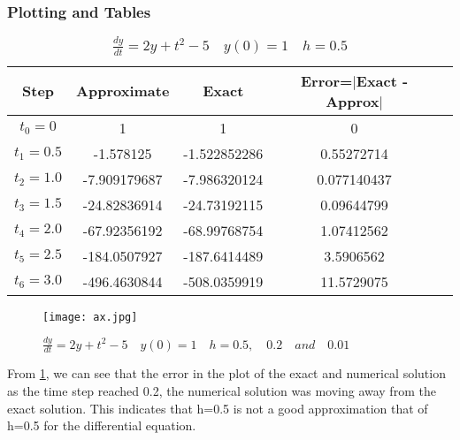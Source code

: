 \documentclass[12pt,a4paper]{article}
\begin{document}
\subsubsection{Plotting and Tables}
\begin{table}[ht]\caption{$\frac{dy}{dt} = 2y + t^2 - 5  \quad y(0)=1 \quad h=0.5$}
\begin{center}
\begin{tabular}{|c|c|c|c|c|}
\hline
Step  &  Approximate  & Exact & Error=$|$Exact - Approx$|$ \\
\hline
$t_0 = 0 $ & 1 & 1 & 0 \\
\hline
$t_1 = 0.5 $ & -1.578125 & -1.522852286 & 0.55272714 \\
\hline
$t_2 = 1.0 $ & -7.909179687 & -7.986320124 & 0.077140437 \\
\hline
$t_3 = 1.5 $ & -24.82836914 & -24.73192115 & 0.09644799 \\
\hline
$t_4 = 2.0 $ & -67.92356192 & -68.99768754 & 1.07412562 \\
\hline
$t_5 = 2.5 $ & -184.0507927 & -187.6414489 & 3.5906562 \\
\hline
$t_6 = 3.0 $ & -496.4630844 & -508.0359919 & 11.5729075 \\
\hline
\end{tabular}
\end{center}
\end{table}

\begin{figure}[h]
  \begin{center}
  \texttt{[image: ax.jpg]}
  \end{center}
  \caption{$\frac{dy}{dt} = 2y + t^2 - 5 \quad y(0)= 1 \quad h = 0.5, \quad 0.2 \quad and \quad 0.01 $}
  \label{fig:1.1}
\end{figure}
From \ref{fig:1.1}, we can see that the error in the plot of the exact and numerical solution as the time step reached 0.2, the numerical solution was moving away from the exact solution. This indicates that h=0.5 is not a good approximation that of h=0.5 for the differential equation.
\end{document}
